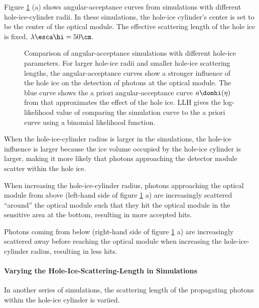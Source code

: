 Figure \ref{fig:neiyi3Al} (a) shows angular-acceptance curves from simulations with different hole-ice-cylinder radii. In these simulations, the hole-ice cylinder's center is set to be the center of the optical module. The effective scattering length of the hole ice is fixed, $\lambda\esca\hi = 50\cm$.

\begin{figure}[htbp]
  \hfill
  \hfill
  \caption{Comparison of angular-acceptance simulations with different hole-ice parameters. For larger hole-ice radii and smaller hole-ice scattering lengths, the angular-acceptance curves show a stronger influence of the hole ice on the detection of photons at the optical module. The blue curve shows the a priori angular-acceptance curve $a\domhi(\eta)$ from \cite{icepaper} that approximates the effect of the hole ice. LLH gives the log-likelihood value of comparing the simulation curve to the a priori curve using a binomial likelihood function.}
  \label{fig:neiyi3Al}
\end{figure}

When the hole-ice-cylinder radius is larger in the simulations, the hole-ice influence is larger because the ice volume occupied by the hole-ice cylinder is larger, making it more likely that photons approaching the detector module scatter within the hole ice.

When increasing the hole-ice-cylinder radius, photons approaching the optical module from above (left-hand side of figure \ref{fig:neiyi3Al} a) are increasingly scattered ``around'' the optical module such that they hit the optical module in the sensitive area at the bottom, resulting in more accepted hits.

Photons coming from below (right-hand side of figure \ref{fig:neiyi3Al} a) are increasingly scattered away before reaching the optical module when increasing the hole-ice-cylinder radius, resulting in less hits.


\paragraph{Varying the Hole-Ice-Scattering-Length in Simulations}
In another series of simulations, the scattering length of the propagating photons within the hole-ice cylinder is variied.

